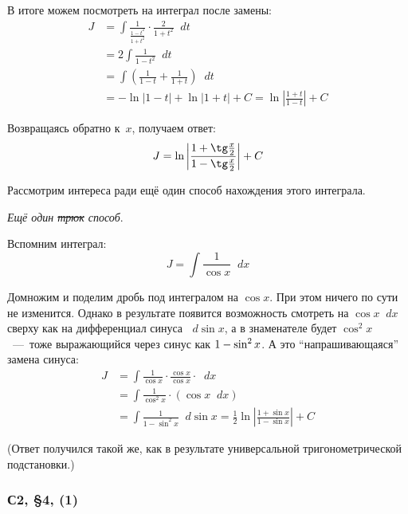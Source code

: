 \documentclass[a4paper,12pt]{article}
\newcommand{\diff}{\mathop{}\!d}
\begin{document}
\begin{solution}
    В итоге можем посмотреть на интеграл после замены:
    \begin{equation*}
    \begin{split}
      J &= \int \frac{1}{\frac{1 - t^2}{1 + t^2}} \cdot \frac{2}{1 + t^2} \diff t\\
        &= 2 \int \frac{1}{1 - t^2} \diff t\\
        &= \int \left(\frac{1}{1 - t} + \frac{1}{1 + t}\right) \diff t\\
        &= -\ln|1 - t| + \ln |1 + t| + C
        = \ln \left|\frac{1 + t}{1 - t}\right| + C
    \end{split}
    \end{equation*}

    Возвращаясь обратно к~$x$, получаем ответ:
    \[
      J = \ln \left|\frac{1 + \tg \frac{x}{2}}{1 - \tg \frac{x}{2}}\right| + C
    \]

    Рассмотрим интереса ради ещё один способ нахождения этого интеграла.

    \medskip

    \noindent
    \emph{Ещё один \st{трюк} способ}.

    Вспомним интеграл:
    \[
      J = \int \frac{1}{\cos x} \diff x
    \]

    Домножим и поделим дробь под интегралом на $\cos x$.
    При этом ничего по сути не изменится.
    Однако в результате появится возможность смотреть на $\cos x \diff x$ сверху как на дифференциал синуса $\diff \sin x$, а в знаменателе будет $\cos^2 x$~---~тоже выражающийся через синус как $1 \hm- \sin^2 x$.
    А это ``напрашивающаяся'' замена синуса:
    \begin{equation*}
    \begin{split}
      J &= \int \frac{1}{\cos x} \cdot \frac{\cos x}{\cos x} \cdot \diff x\\
        &= \int \frac{1}{\cos^2 x} \cdot (\cos x\diff x)\\
        &= \int \frac{1}{1 - \sin^2 x} \diff \sin x
        = \frac{1}{2} \ln\left|\frac{1 + \sin x}{1 - \sin x}\right| + C
    \end{split}
    \end{equation*}

    (Ответ получился такой же, как в результате универсальной тригонометрической подстановки.)
  \end{solution}
  

  \subsubsection{С2, \S 4, (1)}
\end{document}
